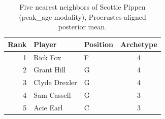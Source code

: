 \begin{table}[htbp]
  \centering\small
  \begin{tabular}{rllc}
    \toprule
    Rank & Player & Position & Archetype \\
    \midrule
    1 & Rick Fox & F & 4 \\
    2 & Grant Hill & G & 4 \\
    3 & Clyde Drexler & G & 4 \\
    4 & Sam Cassell & G & 3 \\
    5 & Acie Earl & C & 3 \\
    \bottomrule
  \end{tabular}
  \caption{Five nearest neighbors of Scottie Pippen (peak_age modality), Procrustes-aligned posterior mean.}
  \label{tab:Scottie_Pippen_neighbors_peak_age}
\end{table}

